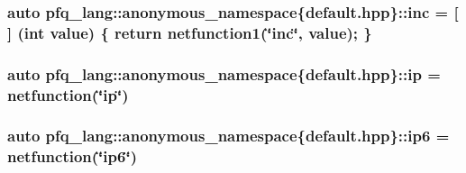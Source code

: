 \hypertarget{namespacepfq__lang_1_1anonymous__namespace_02default_8hpp_03_a14246183085ec07f08ab9b0d53907ae5}{
\subsubsection[{inc}]{\setlength{\rightskip}{0pt plus 5cm}auto pfq\+\_\+lang\+::anonymous\+\_\+namespace\{default.\+hpp\}\+::inc = \mbox{[}$\,$\mbox{]} (int value) \{ return {\bf netfunction1}(\char`\"{}inc\char`\"{}, value); \}}}\label{namespacepfq__lang_1_1anonymous__namespace_02default_8hpp_03_a14246183085ec07f08ab9b0d53907ae5}
\hypertarget{namespacepfq__lang_1_1anonymous__namespace_02default_8hpp_03_a27d30e7744c84a7cdc41a710ee16b885}{
\subsubsection[{ip}]{\setlength{\rightskip}{0pt plus 5cm}auto pfq\+\_\+lang\+::anonymous\+\_\+namespace\{default.\+hpp\}\+::ip = {\bf netfunction}(\char`\"{}ip\char`\"{})}}\label{namespacepfq__lang_1_1anonymous__namespace_02default_8hpp_03_a27d30e7744c84a7cdc41a710ee16b885}
\hypertarget{namespacepfq__lang_1_1anonymous__namespace_02default_8hpp_03_a566cbe8627dd2ae05071690ef64dbd12}{
\subsubsection[{ip6}]{\setlength{\rightskip}{0pt plus 5cm}auto pfq\+\_\+lang\+::anonymous\+\_\+namespace\{default.\+hpp\}\+::ip6 = {\bf netfunction}(\char`\"{}ip6\char`\"{})}}\label{namespacepfq__lang_1_1anonymous__namespace_02default_8hpp_03_a566cbe8627dd2ae05071690ef64dbd12}
